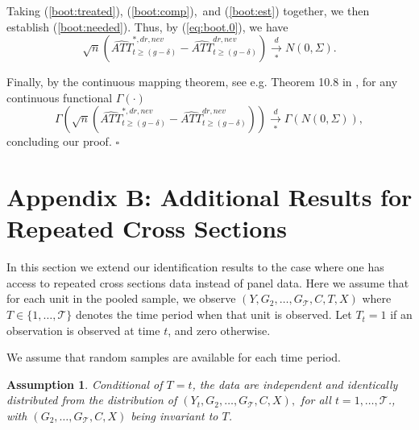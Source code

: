 \documentclass[11pt]{article}%
\theoremstyle{plain}
\newtheorem{assumption}{Assumption}
\numberwithin{sassumption}{section}
\numberwithin{equation}{section}
\begin{document}
{\small Taking (\ref{boot:treated}), (\ref{boot:comp}),\ and (\ref{boot:est})
together, we then establish (\ref{boot:needed}). Thus, by (\ref{eq:boot.0}),
we have%
\[
\sqrt{n}\left(  \widehat{ATT}_{t\geq\left(  g-\delta\right)  }^{\ast
,dr,nev}-\widehat{ATT}_{t\geq\left(  g-\delta\right)  }^{dr,nev}\right)
\underset{\ast}{\overset{d}{\rightarrow}}N(0,\Sigma).
\]
}

{\small Finally, by the continuous mapping theorem, see e.g. Theorem 10.8 in
\cite{kosorok2008}, for any continuous functional $\Gamma(\cdot)$
\[
\Gamma\left(  \sqrt{n}\left(  \widehat{ATT}_{t\geq\left(  g-\delta\right)
}^{\ast,dr,nev}-\widehat{ATT}_{t\geq\left(  g-\delta\right)  }^{dr,nev}%
\right)  \right)  \underset{\ast}{\overset{d}{\rightarrow}}\Gamma\left(
N(0,\Sigma)\right)  ,
\]
concluding our proof. $\square$ }

\section*{Appendix B: Additional Results for Repeated Cross
Sections\label{App.B}}

\renewcommand{\thesection}{B}
\renewcommand{\theassumption}{B.\arabic{assumption}}
\renewcommand{\thelemma}{B.\arabic{lemma}} \setcounter{lemma}{0}
\setcounter{equation}{0} \setcounter{figure}{0} \setcounter{section}{0}
\renewcommand{\thetheorem}{B.\arabic{theorem}} \setcounter{theorem}{0}
\setcounter{assumption}{0} {\small In this section we extend our
identification results to the case where one has access to repeated cross
sections data instead of panel data. Here we assume that for each unit in the
pooled sample, we observe $(Y,G_{2},\ldots,G_{\mathcal{T}},C,T,X)$ where
$T\in\{1,\ldots,\mathcal{T}\}$ denotes the time period when that unit is
observed. Let $T_{t}=1$ if an observation is observed at time $t$, and zero
otherwise. }

{\small We assume that random samples are available for each time period. }

\begin{assumption}
{\small \label{sampling_rcs}Conditional of $T=t$, the data are independent and
identically distributed from the distribution of $\left(  Y_{t},G_{2}%
,\ldots,G_{\mathcal{T}},C,X\right)  ,$ for all $t=1,\dots,\mathcal{T}$., with
$\left(  G_{2},\ldots,G_{\mathcal{T}},C,X\right)  $ being invariant to $T$. }
\end{assumption}
\end{document}
